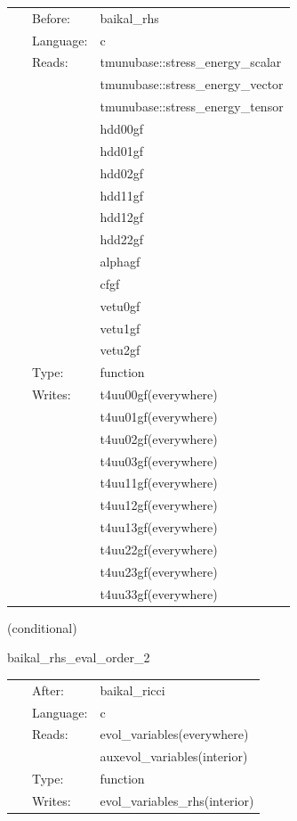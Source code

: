  \begin{tabular*}{160mm}{cll} 
~ & Before:  & baikal\_rhs \\ 
~ & Language:  & c \\ 
~ & Reads:  & tmunubase::stress\_energy\_scalar \\ 
~& ~ &tmunubase::stress\_energy\_vector\\ 
~& ~ &tmunubase::stress\_energy\_tensor\\ 
~& ~ &hdd00gf\\ 
~& ~ &hdd01gf\\ 
~& ~ &hdd02gf\\ 
~& ~ &hdd11gf\\ 
~& ~ &hdd12gf\\ 
~& ~ &hdd22gf\\ 
~& ~ &alphagf\\ 
~& ~ &cfgf\\ 
~& ~ &vetu0gf\\ 
~& ~ &vetu1gf\\ 
~& ~ &vetu2gf\\ 
~ & Type:  & function \\ 
~ & Writes:  & t4uu00gf(everywhere) \\ 
~& ~ &t4uu01gf(everywhere)\\ 
~& ~ &t4uu02gf(everywhere)\\ 
~& ~ &t4uu03gf(everywhere)\\ 
~& ~ &t4uu11gf(everywhere)\\ 
~& ~ &t4uu12gf(everywhere)\\ 
~& ~ &t4uu13gf(everywhere)\\ 
~& ~ &t4uu22gf(everywhere)\\ 
~& ~ &t4uu23gf(everywhere)\\ 
~& ~ &t4uu33gf(everywhere)\\ 
\end{tabular*} 


\vspace{5mm}

   (conditional) 

\hspace{5mm} baikal\_rhs\_eval\_order\_2 

\hspace{5mm}{\it evaluate bssn rhss, at finite-differencing order 2 } 


\hspace{5mm}

 \begin{tabular*}{160mm}{cll} 
~ & After:  & baikal\_ricci \\ 
~ & Language:  & c \\ 
~ & Reads:  & evol\_variables(everywhere) \\ 
~& ~ &auxevol\_variables(interior)\\ 
~ & Type:  & function \\ 
~ & Writes:  & evol\_variables\_rhs(interior) \\ 
\end{tabular*} 


